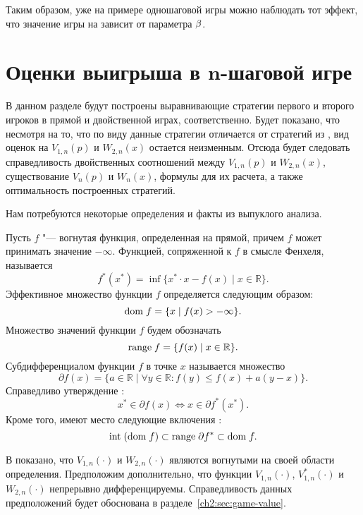 {Таким образом, уже на примере одношаговой игры можно наблюдать тот эффект, что значение игры на зависит от параметра $\beta$.


\section{Оценки выигрыша в $\mathbf{n}$-шаговой игре}
\label{ch2:sec:value-bounds}

В данном разделе будут построены выравнивающие стратегии первого и второго игроков в прямой и двойственной играх, соответственно.
Будет показано, что несмотря на то, что по виду данные стратегии отличается от стратегий из \cite{demeyer02}, вид оценок на $V_{1,n}(p)$ и $W_{2,n}(x)$ остается неизменным.
Отсюда будет следовать справедливость двойственных соотношений между $V_{1,n}(p)$ и $W_{2,n}(x)$, существование $V_n(p)$ и $W_n(x)$, формулы для их расчета, а также оптимальность построенных стратегий.

Нам потребуются некоторые определения и факты из выпуклого анализа.

Пусть $f$ "--- вогнутая функция, определенная на прямой, причем $f$ может принимать значение $-\infty$.
Функцией, сопряженной к $f$ в смысле Фенхеля, называется
\begin{equation*}
  f^*(x^*) = \inf \{ x^* \cdot x - f(x) \;|\; x \in \mathbb{R} \}.
\end{equation*}
Эффективное множество функции $f$ определяется следующим образом:
\[
\mathrm{dom\;} f = \{ x \;|\; f(x) > -\infty \}.
\]
Множество значений функции $f$ будем обозначать \[
\mathrm{range\;} f = \{ f(x) \;|\; x \in \mathbb{R} \}.
\]
%
Субдифференциалом функции $f$ в точке $x$ называется множество
\begin{equation*}
  \partial f(x) =
  \{ a \in \mathbb{R} \;|\; \forall y \in \mathbb{R}: f(y) \leqslant f(x) + a(y-x) \}.
\end{equation*}
%
Справедливо утверждение \cite[Теорема 23.5]{rockafellar73}:
\begin{equation}\label{ch2:eq:subdiff-props}
  x^* \in \partial f(x) \iff x \in \partial f^*(x^*).
\end{equation}
Кроме того, имеют место следующие включения \cite[\S~24]{rockafellar73}:
\begin{equation}\label{ch2:eq:dual-range}
  \mathrm{int} \; (\mathrm{dom\;} f) \subset \mathrm{range\;} \partial f^* \subset \mathrm{dom\;} f.
\end{equation}

В \cite{demeyer02} показано, что $V_{1,n}(\cdot)$ и $W_{2,n}(\cdot)$ являются вогнутыми на своей области определения.
Предположим дополнительно, что функции $V_{1,n}(\cdot)$, $V^*_{1,n}(\cdot)$ и $W_{2,n}(\cdot)$ непрерывно дифференцируемы.
Справедливость данных предположений будет обоснована в разделе~\ref{ch2:sec:game-value}.


}

